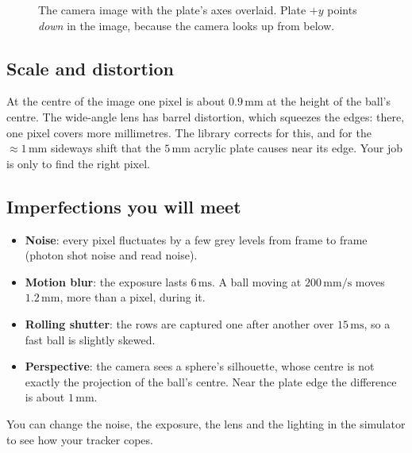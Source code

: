 \documentclass[10pt,a4paper]{article}
\newcommand{\un}[1]{\,\mathrm{#1}}
\begin{document}
\begin{figure}[h]
\centering
{}
\caption{The camera image with the plate's axes overlaid. Plate $+y$ points \emph{down} in the
image, because the camera looks up from below.}
\label{fig:axes}
\end{figure}

\subsection{Scale and distortion}
At the centre of the image one pixel is about $0.9\un{mm}$ at the height of the ball's centre.
The wide-angle lens has barrel distortion, which squeezes the edges: there, one pixel covers more
millimetres. The library corrects for this, and for the $\approx1\un{mm}$ sideways shift that the
$5\un{mm}$ acrylic plate causes near its edge. Your job is only to find the right pixel.

\subsection{Imperfections you will meet}
\begin{itemize}
  \item \textbf{Noise}: every pixel fluctuates by a few grey levels from frame to frame (photon
        shot noise and read noise).
  \item \textbf{Motion blur}: the exposure lasts $6\un{ms}$. A ball moving at $200\un{mm/s}$
        moves $1.2\un{mm}$, more than a pixel, during it.
  \item \textbf{Rolling shutter}: the rows are captured one after another over $15\un{ms}$, so a
        fast ball is slightly skewed.
  \item \textbf{Perspective}: the camera sees a sphere's silhouette, whose centre is not exactly
        the projection of the ball's centre. Near the plate edge the difference is about
        $1\un{mm}$.
\end{itemize}
You can change the noise, the exposure, the lens and the lighting in the simulator to see how
your tracker copes.
\end{document}
